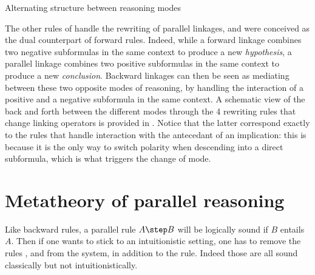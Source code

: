 \begin{marginfigure}
  \begin{center}
  \end{center}
  \caption{Alternating structure between reasoning modes}
\end{marginfigure}

The other rules of  handle the rewriting of parallel linkages,
and were conceived as the dual counterpart of forward rules. Indeed, while a
forward linkage combines two negative subformulas in the same context to produce
a new \emph{hypothesis}, a parallel linkage combines two positive subformulas in
the same context to produce a new \emph{conclusion}. Backward linkages can then
be seen as mediating between these two opposite modes of reasoning, by handling
the interaction of a positive and a negative subformula in the same context. A
schematic view of the back and forth between the different modes through the 4
rewriting rules that change linking operators is provided in
. Notice that the latter correspond exactly to the rules
that handle interaction with the antecedant of an implication: this is because
it is the only way to switch polarity when descending into a direct subformula,
which is what triggers the change of mode.

\section{Metatheory of parallel reasoning}

Like backward rules, a parallel rule $A \step B$ will be logically sound if $B$
entails $A$. Then if one wants to stick to an intuitionistic setting, one has to
remove the rules {}, {} and {} from the system, in addition to the {} rule. Indeed those
are all sound classically but not intuitionistically.


